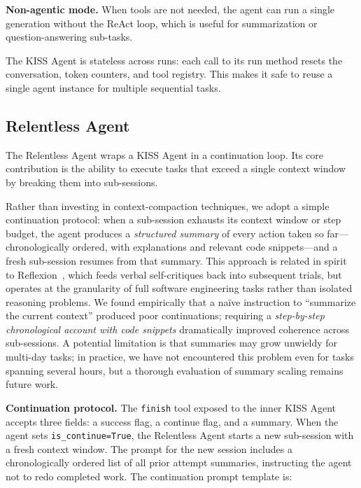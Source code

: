 \documentclass{article}
\begin{document}
\textbf{Non-agentic mode.}  When tools are not needed, the agent can
run a single generation without the ReAct loop, which is useful for
summarization or question-answering sub-tasks.

The KISS Agent is stateless across runs: each call to its run method
resets the conversation, token counters, and tool registry.  This
makes it safe to reuse a single agent instance for multiple sequential
tasks.

\subsection{Relentless Agent}
\label{sec:relentless-agent}

The Relentless Agent wraps a KISS Agent in a continuation loop.  Its
core contribution is the ability to execute tasks that exceed a single
context window by breaking them into sub-sessions.

Rather than investing in context-compaction techniques, we adopt a
simple continuation protocol: when a sub-session exhausts its context
window or step budget, the agent produces a \emph{structured summary}
of every action taken so far---chronologically ordered, with
explanations and relevant code snippets---and a fresh sub-session
resumes from that summary.  This approach is related in spirit to
Reflexion~\citep{shinn2023reflexion}, which feeds verbal
self-critiques back into subsequent trials, but operates at the
granularity of full software engineering tasks rather than isolated
reasoning problems.  We found empirically that a na\"ive instruction
to ``summarize the current context'' produced poor continuations;
requiring a \emph{step-by-step chronological account with code
  snippets} dramatically improved coherence across sub-sessions.
A potential limitation is that summaries may grow unwieldy for
multi-day tasks; in practice, we have not encountered this problem
even for tasks spanning several hours, but a thorough evaluation of
summary scaling remains future work.

\textbf{Continuation protocol.}  The \texttt{finish} tool exposed to
the inner KISS Agent accepts three fields: a success flag, a continue
flag, and a summary.  When the agent sets \texttt{is\_continue=True},
the Relentless Agent starts a new sub-session with a fresh context
window.  The prompt for the new session includes a chronologically
ordered list of all prior attempt summaries, instructing the agent not
to redo completed work.  The continuation prompt template is:
\end{document}
